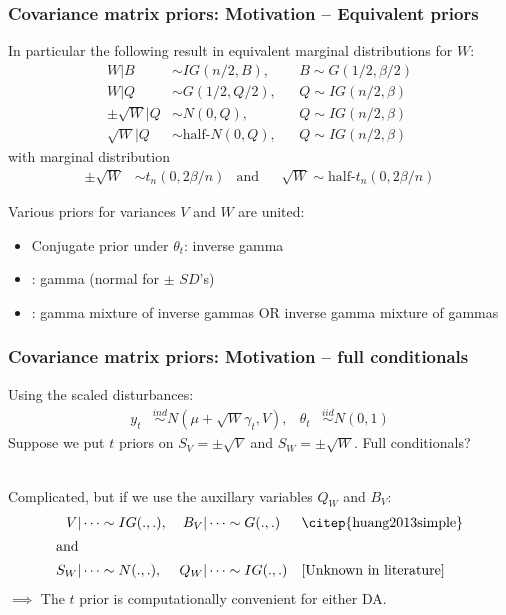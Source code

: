 \documentclass[xcolor=dvipsnames]{beamer}
\begin{document}
\begin{frame}
\frametitle{Covariance matrix priors: Motivation -- Equivalent priors}
In particular the following result in equivalent marginal distributions for $W$:
\begin{align*}
W|B &\sim IG(n/2,B), &&B\sim G(1/2,\beta/2)\\
W|Q &\sim G(1/2,Q/2), &&Q\sim IG(n/2,\beta)\\
\pm\sqrt{W}|Q &\sim N(0,Q), &&Q\sim IG(n/2,\beta)\\
\sqrt{W}|Q &\sim \mbox{half-}N(0,Q), &&Q\sim IG(n/2,\beta)
\end{align*}
with marginal distribution
\begin{align*}
\pm\sqrt{W} &\sim t_n(0,2\beta/n) &\mbox{and}&& \sqrt{W} \sim \mbox{half-}t_n(0,2\beta/n)
\end{align*}

\pause Various priors for variances $V$ and $W$ are united:
\begin{itemize}
\item Conjugate prior under $\theta_t$: inverse gamma
\item \citet{fruhwirth2008bayesian}: gamma (normal for $\pm$ $SD$'s)
\item \citet{gelman2006prior,huang2013simple}: gamma mixture of inverse gammas OR inverse gamma mixture of gammas
\end{itemize}
\end{frame}

\begin{frame}
\frametitle{Covariance matrix priors: Motivation -- full conditionals}
Using the scaled disturbances:
\begin{align*}
 y_t &\stackrel{ind}{\sim} N(\mu + \sqrt{W}\gamma_t, V), & \theta_t &\stackrel{iid}{\sim} N(0,1)
\end{align*}
Suppose we put $t$ priors on $S_V=\pm\sqrt{V}$ and $S_W=\pm\sqrt{W}$. Full conditionals?\\~ \pause

Complicated, but if we use the auxillary variables $Q_W$ and $B_V$:
\begin{align*}
V|\cdots  &\sim IG(.,.), & B_V|\cdots  & \sim G(.,.) &&\mbox{\citep{huang2013simple}}\\%
\intertext{and}
S_W|\cdots  &\sim N(.,.),  &Q_W|\cdots  &\sim IG(.,.) &&\mbox{[Unknown in literature]}%
\end{align*}
\pause $\implies$ The $t$ prior is computationally convenient for either DA.
\end{frame}
\end{document}
